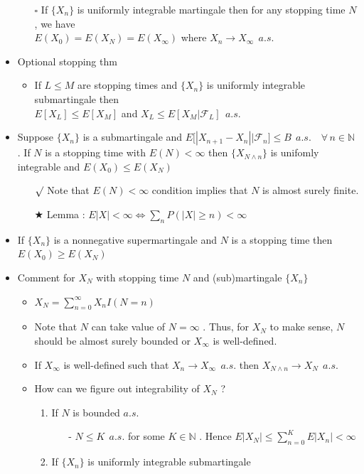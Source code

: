 \documentclass[12pt, A4]{article}
\newcommand{\sq}{$\square$}
\newcommand{\rmk}{$\surd$}
\newcommand{\trick}{$\bigstar$}
\newcommand{\N}{\mathbb{N}}
\newcommand{\F}{\mathcal{F}}
\newcommand{\foranyn}{\quad \forall \, n\in \N}
\begin{document}
\begin{itemize}
\begin{itemize}
		\item[\sq] If $\{X_n\}$ is uniformly integrable martingale then for any stopping time $N$, we have \\$E(X_0)= E(X_N)= E(X_\infty)$ where $X_n\rightarrow X_\infty\;\,a.s.$
	\end{itemize}
	\item Optional stopping thm
	\begin{itemize}
		\item If $L\leq M$ are stopping times and $\{X_n\}$ is uniformly integrable submartingale then \\ $E[X_L]\leq E[X_M]$ and $X_L\leq E[X_M|\F_L]\;\,a.s.$
	\end{itemize}
	\item Suppose $\{X_n\}$ is a submartingale and $E\big[|X_{n+1}-X_n| \big|\F_n \big]\leq B\;\,a.s.\foranyn$ .  If $N$ is a stopping time with $E(N)<\infty$ then $\{X_{N\wedge n}\}$ is unifomly integrable and $E(X_0)\leq E(X_N)$
	\begin{itemize}
		\item[\rmk] Note that $E(N)<\infty$ condition implies that $N$ is almost surely finite.
		\item[\trick] Lemma : $E|X|<\infty \Leftrightarrow \sum_n P(|X|\geq n)<\infty$ 
	\end{itemize}
	\item If $\{X_n\}$ is a nonnegative supermartingale and $N$ is a stopping time then $E(X_0)\geq E(X_N)$
	\item Comment for $X_N$ with stopping time $N$ and (sub)martingale $\{X_n\}$
	\begin{itemize}
		\item $X_N=\sum_{n=0}^\infty X_nI(N=n)$
		\item Note that $N$ can take value of $N=\infty$ . Thus, for $X_N$ to make sense, $N$ should be almost surely bounded or $X_\infty$ is well-defined. 
		\item If $X_\infty$ is well-defined such that $X_n\rightarrow X_\infty\;\,a.s.$ then $X_{N\wedge n}\rightarrow X_N\;\,a.s.$
		\item How can we figure out integrability of $X_N$ ?
		\begin{enumerate}
			\item If $N$ is bounded $a.s.$
			\begin{itemize}
				\item[-] $N\leq K\;\,a.s.$ for some $K\in \N$ . Hence $E|X_N|\leq \sum_{n=0}^K E|X_n|<\infty$
			\end{itemize}
			\item If $\{X_n\}$ is uniformly integrable submartingale

\end{enumerate}
\end{itemize}
\end{itemize}
\end{document}
